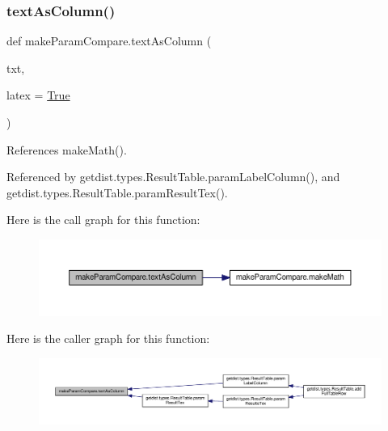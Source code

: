 \mbox{\label{namespacemakeParamCompare_af6412cdf7981f80c455ba678d6fe800a}} 
\subsubsection{\texorpdfstring{text\+As\+Column()}{textAsColumn()}}
{\footnotesize\ttfamily def make\+Param\+Compare.\+text\+As\+Column (\begin{DoxyParamCaption}\item[{}]{txt,  }\item[{}]{latex = {\ttfamily \mbox{\hyperlink{namespacemakeParamCompare_aabddf04b32ac6fb88ad21c814a6d8c8e}{True}}} }\end{DoxyParamCaption})}



References make\+Math().



Referenced by getdist.\+types.\+Result\+Table.\+param\+Label\+Column(), and getdist.\+types.\+Result\+Table.\+param\+Result\+Tex().

Here is the call graph for this function\+:
\nopagebreak
\begin{figure}[H]
\begin{center}
\leavevmode
\includegraphics[width=350pt]{namespacemakeParamCompare_af6412cdf7981f80c455ba678d6fe800a_cgraph}
\end{center}
\end{figure}
Here is the caller graph for this function\+:
\nopagebreak
\begin{figure}[H]
\begin{center}
\leavevmode
\includegraphics[width=350pt]{namespacemakeParamCompare_af6412cdf7981f80c455ba678d6fe800a_icgraph}
\end{center}
\end{figure}


